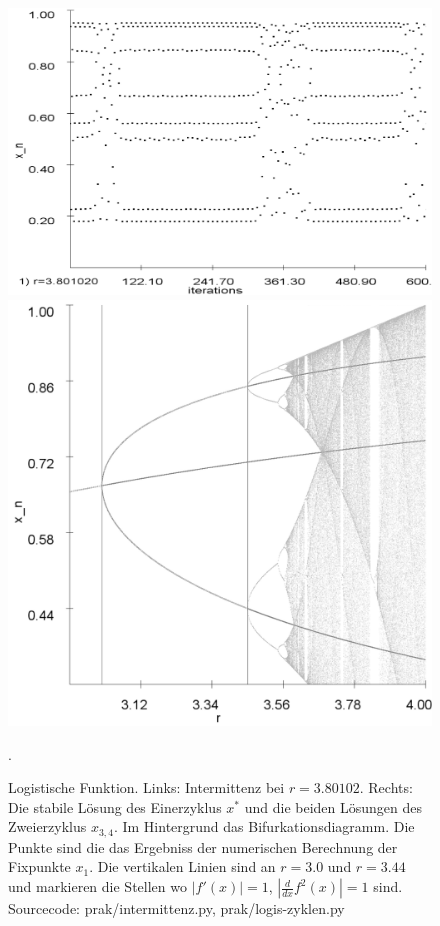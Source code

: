 \documentclass{scrartcl}
\begin{document}
\begin{figure}[!htbp]
\centering
\includegraphics[scale=0.22]{intermittenz}
\includegraphics[scale=0.15]{analy-periodenv}
\caption{Logistische Funktion. Links: Intermittenz bei $r=3.80102$. Rechts: Die stabile Lösung des Einerzyklus $x^*$ und die beiden Lösungen des Zweierzyklus $x_{3,4}$. Im Hintergrund das Bifurkationsdiagramm. Die Punkte sind die das Ergebniss der numerischen Berechnung der Fixpunkte $x_1$. Die vertikalen Linien sind an $r=3.0$ und $r=3.44$ und markieren die Stellen wo $|f'(x)|=1$, $|\frac{d}{dx}f^2(x)|=1$ sind. Sourcecode: prak/intermittenz.py, prak/logis-zyklen.py}. 
\label{fig:log-intermittenz-cycles}
\end{figure}
\end{document}

